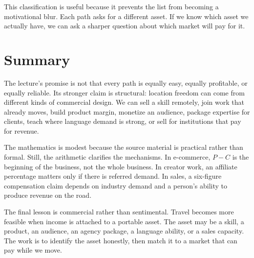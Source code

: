 This classification is useful because it prevents the list from becoming a motivational blur. Each path asks for a different asset. If we know which asset we actually have, we can ask a sharper question about which market will pay for it.

\section{Summary}

The lecture's promise is not that every path is equally easy, equally profitable, or equally reliable. Its stronger claim is structural: location freedom can come from different kinds of commercial design. We can sell a skill remotely, join work that already moves, build product margin, monetize an audience, package expertise for clients, teach where language demand is strong, or sell for institutions that pay for revenue.

The mathematics is modest because the source material is practical rather than formal. Still, the arithmetic clarifies the mechanisms. In e-commerce, \(P-C\) is the beginning of the business, not the whole business. In creator work, an affiliate percentage matters only if there is referred demand. In sales, a six-figure compensation claim depends on industry demand and a person's ability to produce revenue on the road.

The final lesson is commercial rather than sentimental. Travel becomes more feasible when income is attached to a portable asset. The asset may be a skill, a product, an audience, an agency package, a language ability, or a sales capacity. The work is to identify the asset honestly, then match it to a market that can pay while we move.